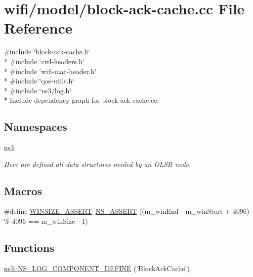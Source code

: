 \hypertarget{block-ack-cache_8cc}{}\section{wifi/model/block-\/ack-\/cache.cc File Reference}
\label{block-ack-cache_8cc}
{\ttfamily \#include \char`\"{}block-\/ack-\/cache.\+h\char`\"{}}\\*
{\ttfamily \#include \char`\"{}ctrl-\/headers.\+h\char`\"{}}\\*
{\ttfamily \#include \char`\"{}wifi-\/mac-\/header.\+h\char`\"{}}\\*
{\ttfamily \#include \char`\"{}qos-\/utils.\+h\char`\"{}}\\*
{\ttfamily \#include \char`\"{}ns3/log.\+h\char`\"{}}\\*
Include dependency graph for block-\/ack-\/cache.cc\+:
\subsection*{Namespaces}
\begin{DoxyCompactItemize}
\item 
 \hyperlink{namespacens3}{ns3}
\begin{DoxyCompactList}\small\item\em Here are defined all data structures needed by an O\+L\+SR node. \end{DoxyCompactList}\end{DoxyCompactItemize}
\subsection*{Macros}
\begin{DoxyCompactItemize}
\item 
\#define \hyperlink{block-ack-cache_8cc_afef56394603e35fab34774311bbdc3fa}{W\+I\+N\+S\+I\+Z\+E\+\_\+\+A\+S\+S\+E\+RT}~\hyperlink{assert_8h_a6dccdb0de9b252f60088ce281c49d052}{N\+S\+\_\+\+A\+S\+S\+E\+RT} ((m\+\_\+win\+End -\/ m\+\_\+win\+Start + 4096) \% 4096 == m\+\_\+win\+Size -\/ 1)
\end{DoxyCompactItemize}
\subsection*{Functions}
\begin{DoxyCompactItemize}
\item 
\hyperlink{namespacens3_a3fda1f4483514907cfc130c458b9cb68}{ns3\+::\+N\+S\+\_\+\+L\+O\+G\+\_\+\+C\+O\+M\+P\+O\+N\+E\+N\+T\+\_\+\+D\+E\+F\+I\+NE} (\char`\"{}Block\+Ack\+Cache\char`\"{})
\end{DoxyCompactItemize}


